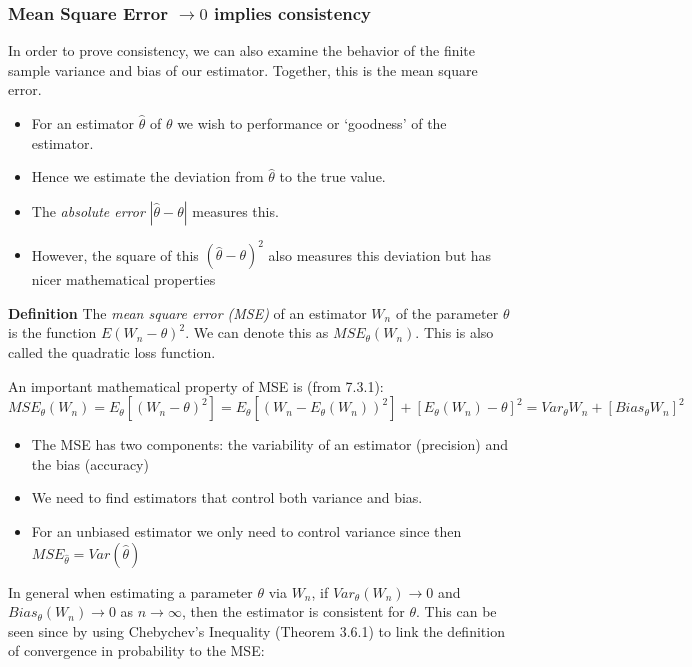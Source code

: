 \documentclass[11pt,]{article}
\def\thetahat{{\widehat\theta}}
\begin{document}
\hypertarget{mean-square-error-to-0-implies-consistency}{%
\subsubsection{\texorpdfstring{Mean Square Error \(\to 0\) implies
consistency}{Mean Square Error \textbackslash{}to 0 implies consistency}}\label{mean-square-error-to-0-implies-consistency}}

In order to prove consistency, we can also examine the behavior of the
finite sample variance and bias of our estimator. Together, this is the
mean square error.

\begin{itemize}
\item For an estimator $\thetahat$ of $\theta$ we wish to  performance or `goodness' of the estimator.
\item Hence we estimate the deviation from $\thetahat$ to the true value.
\item The {\em absolute error} $|\thetahat - \theta|$ measures this.
\item However, the square of this $(\thetahat - \theta)^2$ also measures this deviation but has nicer mathematical properties
\end{itemize}

\noindent\textbf{Definition} The \emph{mean square error (MSE)} of an
estimator \(W_n\) of the parameter \(\theta\) is the function
\(E(W_n - \theta)^2\). We can denote this as \(MSE_\theta({W_n}).\) This
is also called the quadratic loss function.

An important mathematical property of MSE is (from 7.3.1):
\[MSE_\theta(W_n) = E_\theta[ (W_n - \theta)^2] = E_\theta[(W_n - E_\theta(W_n))^2] + [E_\theta(W_n) - \theta]^2= Var_\theta W_n + [Bias_\theta W_n]^2\]

\begin{itemize}
\item The MSE has two components: the variability of an estimator (precision) and the bias (accuracy)
\item We need to find estimators that control both variance and bias.
\item For an unbiased estimator we only need to control variance since then $MSE_\thetahat = Var(\thetahat)$
\end{itemize}

In general when estimating a parameter \(\theta\) via \(W_n\), if
\(Var_\theta(W_n) \to 0\) and \(Bias_\theta(W_n) \to 0\) as
\(n\to \infty\), then the estimator is consistent for \(\theta\). This
can be seen since by using Chebychev's Inequality (Theorem 3.6.1) to
link the definition of convergence in probability to the MSE:
\end{document}
